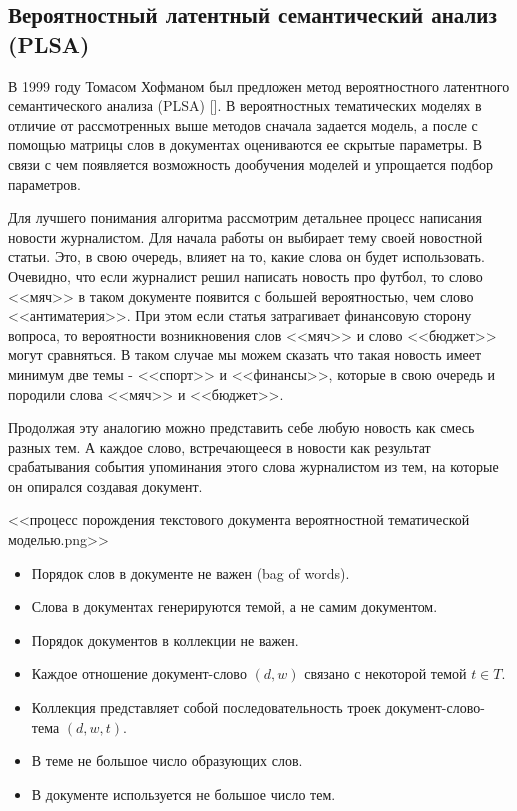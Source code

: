 
\subsection{Вероятностный латентный семантический анализ (PLSA)}

В 1999 году Томасом Хофманом был предложен метод вероятностного латентного семантического анализа (PLSA) [\todo{}]. В вероятностных тематических моделях в отличие от рассмотренных выше методов сначала задается модель, а после с помощью матрицы слов в документах оцениваются ее скрытые параметры. В связи с чем появляется возможность дообучения моделей и упрощается подбор параметров.

Для лучшего понимания алгоритма рассмотрим детальнее процесс написания новости журналистом. Для начала работы он выбирает тему своей новостной статьи. Это, в свою очередь, влияет на то, какие слова он будет использовать. Очевидно, что если журналист решил написать новость про футбол, то слово <<мяч>> в таком документе появится с большей вероятностью, чем слово <<антиматерия>>. При этом если статья затрагивает финансовую сторону вопроса, то вероятности возникновения слов <<мяч>> и слово <<бюджет>> могут сравняться. В таком случае мы можем сказать что такая новость имеет минимум две темы - <<спорт>> и <<финансы>>, которые в свою очередь и породили слова <<мяч>> и <<бюджет>>. 

Продолжая эту аналогию можно представить себе любую новость как смесь разных тем. А каждое слово, встречающееся в новости как результат срабатывания события упоминания этого слова журналистом из тем, на которые он опирался создавая документ.

<<процесс порождения текстового документа вероятностной тематической моделью.png>>


\begin{itemize}
    \item Порядок слов в документе не важен (bag of words).
    \item Слова в документах генерируются темой, а не самим документом.
    \item Порядок документов в коллекции не важен.
    \item Каждое отношение документ-слово $(d,w)$ связано с некоторой темой $t \in T$.
    \item Коллекция представляет собой последовательность троек документ-слово-тема $(d,w,t)$.
    \item В теме не большое число образующих слов.
    \item В документе используется не большое число тем.
\end{itemize}

